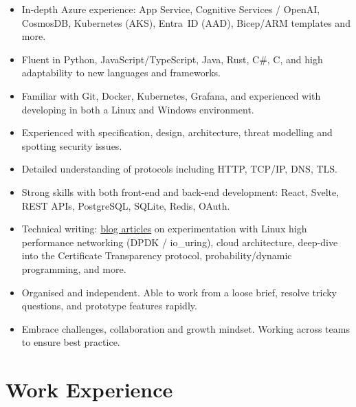   \begin{itemize}
    \setlength\itemsep{0.1\parskip}
    \item In-depth Azure experience: App Service, Cognitive Services / OpenAI, CosmosDB, Kubernetes (AKS), Entra~ID (AAD), Bicep/ARM templates and more.
    \item Fluent in Python, JavaScript/TypeScript, Java, Rust, C\#, C, and high adaptability to new languages and frameworks.
    \item Familiar with Git, Docker, Kubernetes, Grafana, and experienced with developing in both a Linux and Windows environment.
    \item Experienced with specification, design, architecture, threat modelling and spotting security issues.
    \item Detailed understanding of protocols including HTTP, TCP/IP, DNS, TLS.
    \item Strong skills with both front-end and back-end development: React, Svelte, REST APIs, PostgreSQL, SQLite, Redis, OAuth.
    \item Technical writing: \href{https://blog.maowtm.org/}{\color{link}blog articles} on experimentation with Linux high performance networking (DPDK / io\_uring), cloud architecture, deep-dive into the Certificate Transparency protocol, probability/dynamic programming, and more.
    \item Organised and independent. Able to work from a loose brief, resolve tricky questions, and prototype features rapidly.
    \item Embrace challenges, collaboration and growth mindset. Working across teams to ensure best practice.
  \end{itemize}

  \section{Work Experience}

